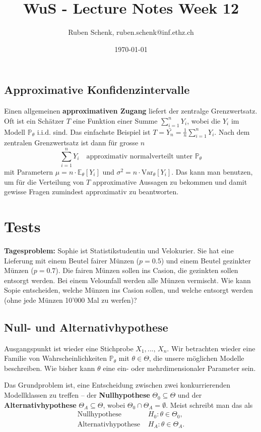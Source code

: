 \documentclass[a4paper]{extarticle}
\title{WuS - Lecture Notes Week 12}
\author{Ruben Schenk, ruben.schenk@inf.ethz.ch}
\date{\today}
\begin{document}
\maketitle

\subsection{Approximative Konfidenzintervalle}

Einen allgemeinen \textbf{approximativen Zugang} liefert der zentralge Grenzwertsatz. Oft ist ein Schätzer $T$ eine Funktion einer Summe $\sum_{i = 1}^n Y_i$, wobei die $Y_i$ im Modell $\mathbb{P}_{\theta}$ i.i.d. sind. Das einfachste Beispiel ist $T = \bar{Y_n} = \frac{1}{n}\sum_{i = 1}^n Y_i$. Nach dem zentralen Grenzwertsatz ist dann für grosse $n$
\[
    \sum_{i = 1}^n Y_i \quad \text{approximativ normalverteilt unter } \mathbb{P}_{\theta}
\]
mit Parametern $\mu = n \cdot \mathbb{E}_{\theta}[Y_i]$ und $\sigma^2 = n \cdot \text{Var}_{\theta}[Y_i]$. Das kann man benutzen, um für die Verteilung von $T$ approximative Aussagen zu bekommen und damit gewisse Fragen zumindest approximativ zu beantworten.

\section{Tests}

\textbf{Tagesproblem:} Sophie ist Statistikstudentin und Velokurier. Sie hat eine Lieferung mit einem Beutel fairer Münzen ($p = 0.5$) und einem Beutel gezinkter Münzen ($p = 0.7$). Die fairen Münzen sollen ins Casion, die gezinkten sollen entsorgt werden. Bei einem Velounfall werden alle Münzen vermischt. Wie kann Sopie entscheiden, welche Münzen ins Casion sollen, und welche entsorgt werden (ohne jede Münzen 10'000 Mal zu werfen)?

\subsection{Null- und Alternativhypothese}

Ausgangspunkt ist wieder eine Stichprobe $X_1,..., \, X_n$. Wir betrachten wieder eine Familie von Wahrscheinlichkeiten $\mathbb{P}_{\theta}$ mit $\theta \in \Theta$, die unsere möglichen Modelle beschreiben. Wie bisher kann $\theta$ eine ein- oder mehrdimensionaler Parameter sein.

Das Grundproblem ist, eine Entscheidung zwischen zwei konkurrierenden Modellklassen zu treffen -- der \textbf{Nullhypothese} $\Theta_0 \subseteq \Theta$ und der \textbf{Alternativhypothese} $\Theta_A \subseteq \Theta$, wobei $\Theta_0 \cap \Theta_A = \emptyset$. Meist schreibt man das als
\begin{align*}
    \text{Nullhypothese } &H_0 : \theta \in \Theta_0,\\
    \text{Alternativhypothese } &H_A : \theta \in \Theta_A.
\end{align*}
\end{document}
